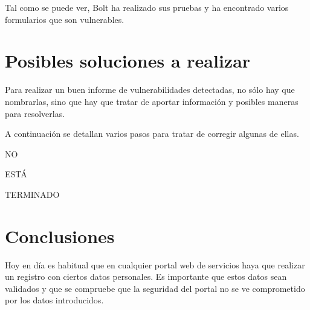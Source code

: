 \documentclass{\ClassPath/viu-tfm-template}
\begin{document}
Tal como se puede ver, Bolt ha realizado sus pruebas y ha encontrado varios formularios que son vulnerables.


\chapter{Posibles soluciones a realizar}
Para realizar un buen informe de vulnerabilidades detectadas, no sólo hay que nombrarlas, sino que hay que tratar de aportar información y posibles maneras para resolverlas.

A continuación se detallan varios pasos para tratar de corregir algunas de ellas.


NO

ESTÁ

TERMINADO


\chapter{Conclusiones}
Hoy en día es habitual que en cualquier portal web de servicios haya que realizar un registro con ciertos datos personales. Es importante que estos datos sean validados y que se compruebe que la seguridad del portal no se ve comprometido por los datos introducidos.
\end{document}
